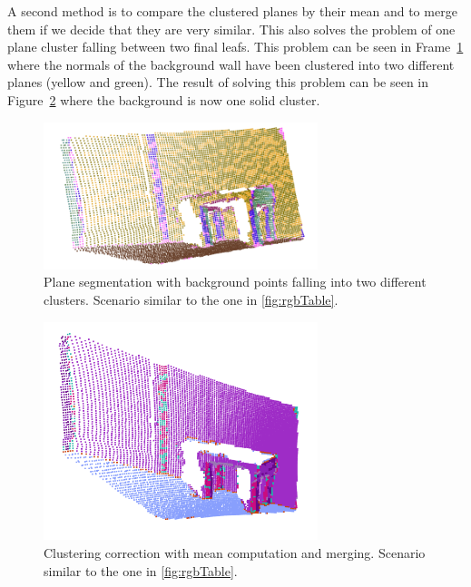 \documentclass[fontsize=12pt]{article}
\begin{document}
A second method is to compare the clustered planes by their mean and to merge them if we decide that they are very similar. This also solves the problem of one plane cluster falling between two final leafs. This problem can be seen in Frame~\ref{fig:premergin} where the normals of the background wall have been clustered into two different planes (yellow  and green). The result of solving this problem can be seen in Figure~\ref{fig:posmerging} where the background is now one solid cluster.\\ 


\begin{figure}[!htbp]
  \begin{center}
    \includegraphics[width=8cm]{./images/premergingSegmentation.png}
    \caption{Plane segmentation with background points falling into two different clusters. Scenario similar to the one in \ref{fig:rgbTable}.}
    \label{fig:premergin}
  \end{center}
\end{figure}

\begin{figure}[!htbp]
  \begin{center}
    \includegraphics[width=8cm]{./images/midSegmentation.png}
    \caption{Clustering correction with mean computation and merging. Scenario similar to the one in \ref{fig:rgbTable}.}
    \label{fig:posmerging}
  \end{center}
\end{figure}
\end{document}
